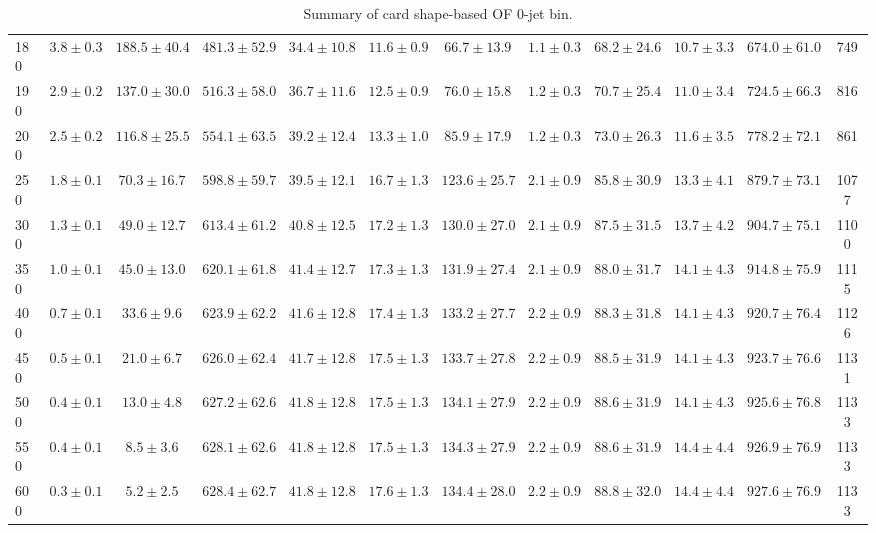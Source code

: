 \begin{table}[!htb]
{\begin{center}
\begin{tabular}{l | c c | c c c c c c c  | c c}
180 & $3.8\pm0.3$ & $188.5\pm40.4$ & $481.3\pm52.9$ & $34.4\pm10.8$ & $11.6\pm0.9$ & $66.7\pm13.9$ & $1.1\pm0.3$ & $68.2\pm24.6$ & $10.7\pm3.3$ & $674.0\pm61.0$ & 749 \\
190 & $2.9\pm0.2$ & $137.0\pm30.0$ & $516.3\pm58.0$ & $36.7\pm11.6$ & $12.5\pm0.9$ & $76.0\pm15.8$ & $1.2\pm0.3$ & $70.7\pm25.4$ & $11.0\pm3.4$ & $724.5\pm66.3$ & 816 \\
200 & $2.5\pm0.2$ & $116.8\pm25.5$ & $554.1\pm63.5$ & $39.2\pm12.4$ & $13.3\pm1.0$ & $85.9\pm17.9$ & $1.2\pm0.3$ & $73.0\pm26.3$ & $11.6\pm3.5$ & $778.2\pm72.1$ & 861 \\
250 & $1.8\pm0.1$ & $70.3\pm16.7$ & $598.8\pm59.7$ & $39.5\pm12.1$ & $16.7\pm1.3$ & $123.6\pm25.7$ & $2.1\pm0.9$ & $85.8\pm30.9$ & $13.3\pm4.1$ & $879.7\pm73.1$ & 1077 \\
300 & $1.3\pm0.1$ & $49.0\pm12.7$ & $613.4\pm61.2$ & $40.8\pm12.5$ & $17.2\pm1.3$ & $130.0\pm27.0$ & $2.1\pm0.9$ & $87.5\pm31.5$ & $13.7\pm4.2$ & $904.7\pm75.1$ & 1100 \\
350 & $1.0\pm0.1$ & $45.0\pm13.0$ & $620.1\pm61.8$ & $41.4\pm12.7$ & $17.3\pm1.3$ & $131.9\pm27.4$ & $2.1\pm0.9$ & $88.0\pm31.7$ & $14.1\pm4.3$ & $914.8\pm75.9$ & 1115 \\
400 & $0.7\pm0.1$ & $33.6\pm9.6$ & $623.9\pm62.2$ & $41.6\pm12.8$ & $17.4\pm1.3$ & $133.2\pm27.7$ & $2.2\pm0.9$ & $88.3\pm31.8$ & $14.1\pm4.3$ & $920.7\pm76.4$ & 1126 \\
450 & $0.5\pm0.1$ & $21.0\pm6.7$ & $626.0\pm62.4$ & $41.7\pm12.8$ & $17.5\pm1.3$ & $133.7\pm27.8$ & $2.2\pm0.9$ & $88.5\pm31.9$ & $14.1\pm4.3$ & $923.7\pm76.6$ & 1131 \\
500 & $0.4\pm0.1$ & $13.0\pm4.8$ & $627.2\pm62.6$ & $41.8\pm12.8$ & $17.5\pm1.3$ & $134.1\pm27.9$ & $2.2\pm0.9$ & $88.6\pm31.9$ & $14.1\pm4.3$ & $925.6\pm76.8$ & 1133 \\
550 & $0.4\pm0.1$ & $8.5\pm3.6$ & $628.1\pm62.6$ & $41.8\pm12.8$ & $17.5\pm1.3$ & $134.3\pm27.9$ & $2.2\pm0.9$ & $88.6\pm31.9$ & $14.4\pm4.4$ & $926.9\pm76.9$ & 1133 \\
600 & $0.3\pm0.1$ & $5.2\pm2.5$ & $628.4\pm62.7$ & $41.8\pm12.8$ & $17.6\pm1.3$ & $134.4\pm28.0$ & $2.2\pm0.9$ & $88.8\pm32.0$ & $14.4\pm4.4$ & $927.6\pm76.9$ & 1133 \\
\hline
\end{tabular}
\end{center}
}
\caption{Summary of card shape-based OF 0-jet bin.}
{%
}
\end{table}
